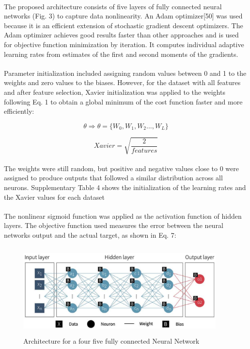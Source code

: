 \documentclass{llncs}       %
\begin{document}
\paragraph{}
The proposed architecture consists of five layers of fully connected neural networks (Fig. 3) to capture data nonlinearity. An Adam optimizer[50] was used because it is an efficient extension of stochastic gradient descent optimizers. The Adam optimizer achieves good results faster than other approaches and is used for objective function minimization by iteration. It computes individual adaptive learning rates from estimates of the first and second moments of the gradients.

\paragraph{}
Parameter initialization included assigning random values between 0 and 1 to the weights and zero values to the biases. However, for the dataset with all features and after feature selection, Xavier initialization was applied to the weights following Eq. 1 to obtain a global minimum of the cost function faster and more efficiently: 

\begin{equation} 
\theta\Rightarrow\theta=\{W_{0},W_{1},W_{2}...,W_{L}\}
\end{equation}

\begin{equation} 
Xavier = \sqrt{\frac{2}{features}}
\end{equation}

\paragraph{}
The weights were still random, but positive and negative values close to 0 were assigned to produce outputs that followed a similar distribution across all neurons. Supplementary Table 4 shows the initialization of the learning rates and the Xavier values for each dataset

\paragraph{}
The nonlinear sigmoid function was applied as the activation function of hidden layers. The objective function used measures the error between the neural networks output and the actual target, as shown in Eq. 7: 

\begin{figure}[h]
\centering
\includegraphics[width=10.51cm,height=4.77cm]{media/deep-nn1.eps}
\caption{Architecture for a four five fully connected 
Neural Network}
\end{figure}
\end{document}
